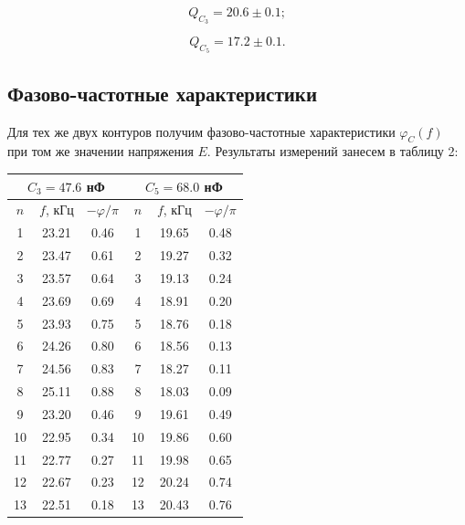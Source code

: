 \documentclass[a4paper,12pt]{article} %
\begin{document}
$$
Q_{C_{3}} = 20.6 \pm 0.1;
$$

$$
Q_{C{_5}} = 17.2 \pm 0.1.
$$

\subsection{Фазово-частотные характеристики}
\hfill \break Для тех же двух контуров получим фазово-частотные характеристики $\varphi_{C}(f)$ при том же значении напряжения $E$. Результаты измерений занесем в таблицу 2:

\begin{center}
	\begin{tabular}{ccc||c|c|c|}
		\hline
		\multicolumn{3}{|c||}{$C_3 = 47.6 $ нФ} & \multicolumn{3}{c|}{$C_5 = 68.0$ нФ} \\ \hline
		\multicolumn{1}{|c|}{$n$} & \multicolumn{1}{c|}{$f$, кГц} & $-\varphi/ \pi$ & $n$ & $f$, кГц & $-\varphi/ \pi$ \\ \hline
		\multicolumn{1}{|c|}{1} & \multicolumn{1}{c|}{23.21} & 0.46 & 1 & 19.65 & 0.48 \\ \hline
		\multicolumn{1}{|c|}{2} & \multicolumn{1}{c|}{23.47} & 0.61 & 2 & 19.27 & 0.32 \\ \hline
		\multicolumn{1}{|c|}{3} & \multicolumn{1}{c|}{23.57} & 0.64 & 3 & 19.13 & 0.24 \\ \hline
		\multicolumn{1}{|c|}{4} & \multicolumn{1}{c|}{23.69} & 0.69 & 4 & 18.91 & 0.20 \\ \hline
		\multicolumn{1}{|c|}{5} & \multicolumn{1}{c|}{23.93} & 0.75 & 5 & 18.76 & 0.18 \\ \hline
		\multicolumn{1}{|c|}{6} & \multicolumn{1}{c|}{24.26} & 0.80 & 6 & 18.56 & 0.13 \\ \hline
		\multicolumn{1}{|c|}{7} & \multicolumn{1}{c|}{24.56} & 0.83 & 7 & 18.27 & 0.11 \\ \hline
		\multicolumn{1}{|c|}{8} & \multicolumn{1}{c|}{25.11} & 0.88 & 8 & 18.03 & 0.09 \\ \hline
		\multicolumn{1}{|c|}{9} & \multicolumn{1}{c|}{23.20} & 0.46 & 9 & 19.61 & 0.49 \\ \hline
		\multicolumn{1}{|c|}{10} & \multicolumn{1}{c|}{22.95} & 0.34 & 10 & 19.86 & 0.60 \\ \hline
		\multicolumn{1}{|c|}{11} & \multicolumn{1}{c|}{22.77} & 0.27 & 11 & 19.98 & 0.65 \\ \hline
		\multicolumn{1}{|c|}{12} & \multicolumn{1}{c|}{22.67} & 0.23 & 12 & 20.24 & 0.74 \\ \hline
		\multicolumn{1}{|c|}{13} & \multicolumn{1}{c|}{22.51} & 0.18 & 13 & 20.43 & 0.76 \\ \hline

\end{tabular}
\end{center}
\end{document}
